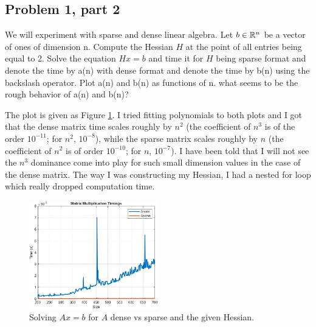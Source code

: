 \subsection{Problem 1, part 2}
We will experiment with sparse and dense linear algebra. Let $b \in \mathbb{R}^n$ be a vector of ones of dimension n. Compute the Hessian $H$ at the point of all entries being equal to 2. Solve the equation $Hx = b$ and time it for $H$ being sparse format and denote the time by a(n) with dense format and denote the time by b(n) using the backslash operator. Plot a(n) and b(n) as functions of n. what seems to be the rough behavior of a(n) and b(n)? 
\partbreak
\begin{solution}

    The plot is given as Figure \ref{fig:MatMult}. I tried fitting polynomials to both plots and I got that the dense matrix time scales roughly by $n^2$ (the coefficient of $n^3$ is of the order $10^{-11}$; for $n^2$, $10^{-8}$), while the sparse matrix scales roughly by $n$ (the coefficient of $n^2$ is of order $10^{-10}$; for $n$, $10^{-7}$). I have been told that I will not see the $n^3$ dominance come into play for such small dimension values in the case of the dense matrix. The way I was constructing my Hessian, I had a nested for loop which really dropped computation time. 
\end{solution}
\vspace{4cm}
\begin{figure}[!h]
    \centering
    \includegraphics[width = 0.5\textwidth]{Plots/MatrixMultiplicationTimings.png}
    \caption{Solving $Ax = b$ for $A$ dense vs sparse and the given Hessian.}
    \label{fig:MatMult}
\end{figure}

\newpage
